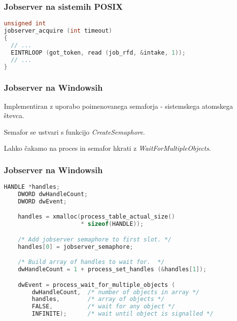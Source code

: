 \documentclass{beamer}
\begin{document}
\begin{frame}[fragile]
  \frametitle{Jobserver na sistemih POSIX}

\begin{lstlisting}[language=C, basicstyle=\sffamily]
unsigned int
jobserver_acquire (int timeout)
{
  // ...
  EINTRLOOP (got_token, read (job_rfd, &intake, 1));
  // ...
}
\end{lstlisting}
\end{frame}

\begin{frame}
  \frametitle{Jobserver na Windowsih}

  Implementiran z uporabo poimenovanega semaforja - sistemskega atomskega števca.

  Semafor se ustvari s funkcijo \textit{CreateSemaphore}.

  Lahko čakamo na proces in semafor hkrati z \textit{WaitForMultipleObjects}.
\end{frame}

\begin{frame}[fragile]
  \frametitle{Jobserver na Windowsih}

\begin{lstlisting}[language=C, basicstyle=\footnotesize]
    HANDLE *handles;
    DWORD dwHandleCount;
    DWORD dwEvent;

    handles = xmalloc(process_table_actual_size()
                      * sizeof(HANDLE));

    /* Add jobserver semaphore to first slot. */
    handles[0] = jobserver_semaphore;

    /* Build array of handles to wait for.  */
    dwHandleCount = 1 + process_set_handles (&handles[1]);

    dwEvent = process_wait_for_multiple_objects (
        dwHandleCount,  /* number of objects in array */
        handles,        /* array of objects */
        FALSE,          /* wait for any object */
        INFINITE);      /* wait until object is signalled */

\end{lstlisting}
\end{frame}
\end{document}
